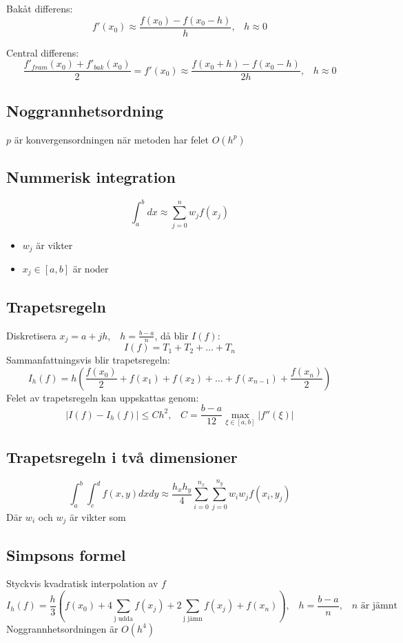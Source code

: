 \documentclass[a4paper,11pt]{article}
\begin{document}
Bakåt differens:
\[
f'(x_0) \approx \frac{f(x_0) - f(x_0 - h)}{h}, \hspace{10pt} h \approx 0
\]

Central differens:
\[
\frac{f'_{fram}(x_0) + f'_{bak}(x_0)}{2} = f'(x_0) \approx \frac{f(x_0 + h) - f(x_0 - h)}{2h}, \hspace{10pt} h \approx 0
\]

\subsection{Noggrannhetsordning}
$p$ är konvergensordningen när metoden har felet $O(h^p)$

\subsection{Nummerisk integration}
\[
\int_{a}^{b}dx \approx \sum_{j=0}^{n} w_j f(x_j)
\]
\begin{itemize}
    \item $w_j$ är vikter
    \item $x_j \in [a, b]$ är noder
\end{itemize}

\subsection{Trapetsregeln}
Diskretisera $x_j = a + jh, \hspace{10pt} h = \frac{b-a}{n}$, då blir $I(f)$:
\[
I(f) = T_1 + T_2 + \hdots + T_n
\]
Sammanfattningsvis blir trapetsregeln:
\[
I_h(f) = h(\frac{f(x_0)}{2} + f(x_1) + f(x_2) + \hdots + f(x_{n-1}) + \frac{f(x_n)}{2})
\]
Felet av trapetsregeln kan uppskattas genom:
\[
|I(f) - I_h(f)| \leq Ch^2, \hspace{10pt} C = \frac{b-a}{12} \max_{\xi \in [a, b]} |f''(\xi)|
\]

\subsection{Trapetsregeln i två dimensioner}
\[\int_{a}^{b} \int_{c}^{d} f(x, y) dx dy \approx \frac{h_x h_y}{4} \sum_{i=0}^{n_x} \sum_{j=0}^{n_y} w_i w_j f(x_i, y_j)\]
Där $w_i$ och $w_j$ är vikter som

\subsection{Simpsons formel}
Styckvis kvadratisk interpolation av $f$
\[
I_h(f) = \frac{h}{3}(f(x_0) + 4\sum_{\text{j udda}} f(x_j) + 2\sum_{\text{j jämn}} f(x_j) + f(x_n)), \hspace{10pt} h = \frac{b-a}{n}, \hspace{10pt} n \text{ är jämnt}
\]
Noggrannhetsordningen är $O(h^4)$
\end{document}
